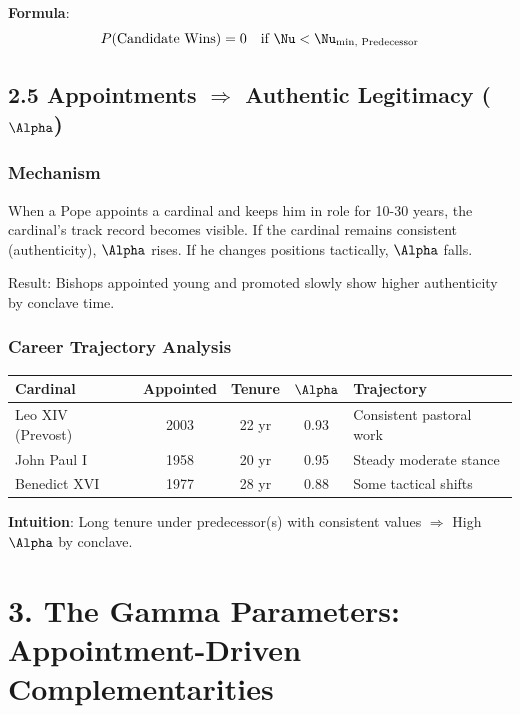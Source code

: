 \textbf{Formula}:
\begin{equation}
P(\text{Candidate Wins}) = 0 \quad \text{if } \Nu < \Nu_{\text{min, Predecessor}}
\end{equation}

\subsection{2.5 Appointments $\Rightarrow$ Authentic Legitimacy ($\Alpha$)}

\subsubsection{Mechanism}

When a Pope appoints a cardinal and keeps him in role for 10-30 years, the cardinal's track record becomes visible. If the cardinal remains consistent (authenticity), $\Alpha$ rises. If he changes positions tactically, $\Alpha$ falls.

Result: Bishops appointed young and promoted slowly show higher authenticity by conclave time.

\subsubsection{Career Trajectory Analysis}

\begin{table}[h]
\centering
\begin{tabular}{|l|c|c|c|l|}
\hline
\textbf{Cardinal} & \textbf{Appointed} & \textbf{Tenure} & $\Alpha$ & \textbf{Trajectory} \\
\hline
Leo XIV (Prevost) & 2003 & 22 yr & 0.93 & Consistent pastoral work \\
John Paul I & 1958 & 20 yr & 0.95 & Steady moderate stance \\
Benedict XVI & 1977 & 28 yr & 0.88 & Some tactical shifts \\
\hline
\end{tabular}
\end{table}

\textbf{Intuition}: Long tenure under predecessor(s) with consistent values $\Rightarrow$ High $\Alpha$ by conclave.

\section{3. The Gamma Parameters: Appointment-Driven Complementarities}

